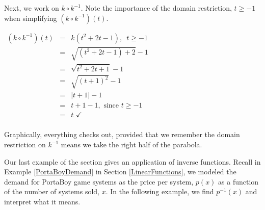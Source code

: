 \documentclass{ximera}
\begin{document}
\begin{example}
\begin{explanation}
\begin{enumerate}
Next, we work on $k \circ k^{-1}$.  Note the importance of the domain restriction, $t \geq -1$ when simplifying $(k \circ k^{-1})(t)$.
\begin{center}
$\begin{array}{rcl}
\left(k \circ k^{-1} \right)(t) & = & k\left( t^2+2t-1 \right), \, \, \, t \geq -1  \\ 
& = & \sqrt{\left(t^2+2t-1\right)+2}-1  \\
& = & \sqrt{t^2+2t+1}-1  \\
& = & \sqrt{(t+1)^2}-1  \\
& = & |t+1| -1  \\
& = & t+1 -1, \, \,  \text{since $t \geq -1$} \\
& = & t \, \, \checkmark \\
\end{array}$
\end{center}

Graphically, everything checks out, provided that we remember the domain restriction on $k^{-1}$ means we take the right half of the parabola.

\begin{center}
\end{center}


\end{enumerate}
\end{explanation}
\end{example}

Our last example of the section gives an application of inverse functions.  Recall in Example \ref{PortaBoyDemand} in Section \ref{LinearFunctions}, we modeled the demand for PortaBoy game systems as the price per system, $p(x)$ as a function of the number of systems sold, $x$.  In the following example, we find $p^{-1}(x)$ and interpret what it means.
\end{document}
